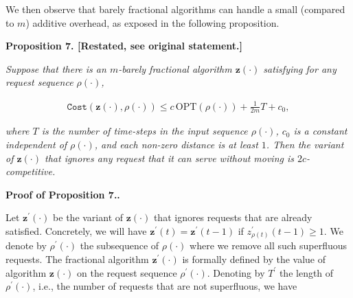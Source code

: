 We then observe that barely fractional algorithms can handle a small (compared to $m$) additive overhead, as exposed in the following proposition.\par






\par\medskip\noindent\textbf{
\textbf{Proposition 7}\textbf{.}
[Restated, see original statement.]}\par



\emph{Suppose that there is an $m$-barely fractional algorithm ${\mathbf{z}}(\cdot)$ satisfying for any request sequence $\rho(\cdot)$,}\par


\[\begin{gathered}
{\texttt{Cost}}({\mathbf{z}}(\cdot),\rho(\cdot))\leq c\,{\text{OPT}}(\rho(\cdot))+\frac{1}{2m}T+c_{0},
\end{gathered}\]


\emph{where $T$ is the number of time-steps in the input sequence $\rho(\cdot)$, $c_{0}$ is a constant independent of $\rho(\cdot)$, and each non-zero distance is at least $1$. Then the variant of ${\mathbf{z}}(\cdot)$ that ignores any request that it can serve without moving is $2c$-competitive.}\par








\par\medskip\noindent\textbf{Proof of Proposition 7..}\par




Let ${\mathbf{z}}^{\prime}(\cdot)$ be the variant of ${\mathbf{z}}(\cdot)$ that ignores requests that are already satisfied. Concretely, we will have ${\mathbf{z}}^{\prime}(t)={\mathbf{z}}^{\prime}(t-1)$ if $z^{\prime}_{\rho(t)}(t-1)\geq 1$. We denote by $\rho^{\prime}(\cdot)$ the subsequence of $\rho(\cdot)$ where we remove all such superfluous requests. The fractional algorithm ${\mathbf{z}}^{\prime}(\cdot)$ is formally defined by the value of algorithm ${\mathbf{z}}(\cdot)$ on the request sequence $\rho^{\prime}(\cdot)$. Denoting by $T^{\prime}$ the length of $\rho^{\prime}(\cdot)$, i.e., the number of requests that are not superfluous, we have\par


